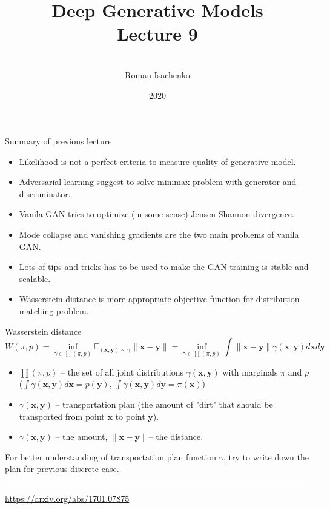 \documentclass{beamer}
\title[\hbox to 56mm{Deep Generative Models  \hfill\insertframenumber\,/\,\inserttotalframenumber}]
{Deep Generative Models \\ Lecture 9}
\author[Roman Isachenko]{\\Roman Isachenko}
\institute[MIPT]{Moscow Institute of Physics and Technology \\
}
\date{2020}
\newcommand{\bx}{\mathbf{x}}
\newcommand{\by}{\mathbf{y}}
\newcommand{\bbE}{\mathbb{E}}
\begin{document}
\begin{frame}
\titlepage
\end{frame}
\begin{frame}{Summary of previous lecture}
\begin{itemize}
	\item Likelihood is not a perfect criteria to measure quality of generative model.
	\item Adversarial learning suggest to solve minimax problem with generator and discriminator.
	\item Vanila GAN tries to optimize (in some sense) Jensen-Shannon divergence.
	\item Mode collapse and vanishing gradients are the two main problems of vanila GAN.
	\item Lots of tips and tricks has to be used to make the GAN training is stable and scalable.
	\item Wasserstein distance is more appropriate objective function for distribution matching problem.
\end{itemize}
\end{frame}
\begin{frame}{Wasserstein distance}
	\[
	W(\pi, p) = \inf_{\gamma \in \prod(\pi, p)} \bbE_{(\bx, \by) \sim \gamma} \| \bx - \by \| =  \inf_{\gamma \in \prod(\pi, p)} \int \| \bx - \by \| \gamma (\bx, \by) d \bx d \by
	\]
	\begin{itemize}
		\item $\prod(\pi, p)$ -- the set of all joint distributions $\gamma (\bx, \by)$ with marginals $\pi$ and $p$ ($\int \gamma(\bx, \by) d \bx = p(\by)$, $\int \gamma(\bx, \by) d \by = \pi(\bx)$)
		\item $\gamma(\bx, \by)$ -- transportation plan (the amount of "dirt" that should be transported from point $\bx$ to point $\by$).
		\item $\gamma(\bx, \by)$ -- the amount, $\|\bx - \by \|$-- the distance.
	\end{itemize}
	For better understanding of transportation plan function $\gamma$, try to write down the plan for previous discrete case.
	\vfill
	\hrule\medskip 
	{\scriptsize \href{https://arxiv.org/abs/1701.07875}{https://arxiv.org/abs/1701.07875}}
\end{frame}
\end{document}
